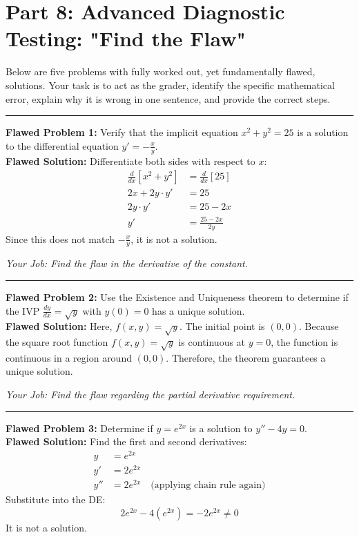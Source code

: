 \documentclass[12pt]{article}
\begin{document}
\newpage
\section{Part 8: Advanced Diagnostic Testing: "Find the Flaw"}

Below are five problems with fully worked out, yet fundamentally flawed, solutions. Your task is to act as the grader, identify the specific mathematical error, explain why it is wrong in one sentence, and provide the correct steps.

\hrule
\vspace{0.3cm}
\textbf{Flawed Problem 1:} Verify that the implicit equation $x^2 + y^2 = 25$ is a solution to the differential equation $y' = -\frac{x}{y}$.
\\
\textbf{Flawed Solution:}
Differentiate both sides with respect to $x$:
\begin{align*}
    \frac{d}{dx}[x^2 + y^2] &= \frac{d}{dx}[25] \\
    2x + 2y \cdot y' &= 25 \\
    2y \cdot y' &= 25 - 2x \\
    y' &= \frac{25 - 2x}{2y}
\end{align*}
Since this does not match $-\frac{x}{y}$, it is not a solution.

\vspace{0.2cm}
\textit{Your Job: Find the flaw in the derivative of the constant.}
\vspace{0.3cm}
\hrule

\vspace{0.3cm}
\textbf{Flawed Problem 2:} Use the Existence and Uniqueness theorem to determine if the IVP $\frac{dy}{dx} = \sqrt{y}$ with $y(0) = 0$ has a unique solution.
\\
\textbf{Flawed Solution:}
Here, $f(x,y) = \sqrt{y}$. The initial point is $(0,0)$. Because the square root function $f(x,y) = \sqrt{y}$ is continuous at $y=0$, the function is continuous in a region around $(0,0)$. Therefore, the theorem guarantees a unique solution.

\vspace{0.2cm}
\textit{Your Job: Find the flaw regarding the partial derivative requirement.}
\vspace{0.3cm}
\hrule

\vspace{0.3cm}
\textbf{Flawed Problem 3:} Determine if $y = e^{2x}$ is a solution to $y'' - 4y = 0$.
\\
\textbf{Flawed Solution:}
Find the first and second derivatives:
\begin{align*}
    y &= e^{2x} \\
    y' &= 2e^{2x} \\
    y'' &= 2e^{2x} \quad \text{(applying chain rule again)}
\end{align*}
Substitute into the DE:
\[ 2e^{2x} - 4(e^{2x}) = -2e^{2x} \neq 0 \]
It is not a solution.
\end{document}
